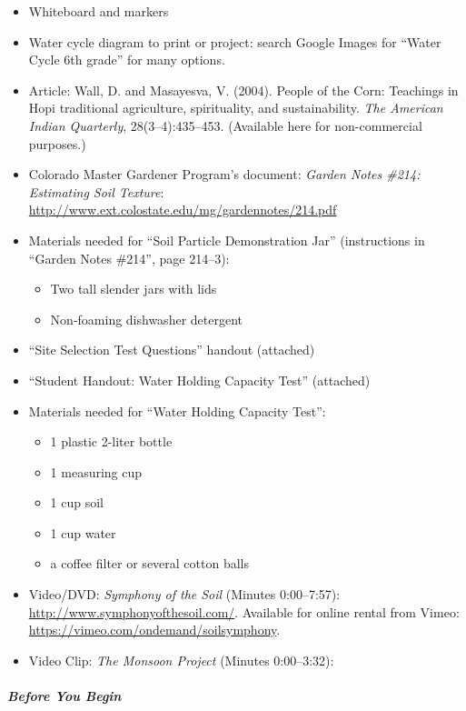 \documentclass[12pt,]{article}
\providecommand{\tightlist}{%
  \setlength{\itemsep}{0pt}\setlength{\parskip}{0pt}}
\let\oldsubparagraph\subparagraph
\renewcommand{\subparagraph}[1]{\oldsubparagraph{#1}\mbox{}}
\begin{document}
\begin{itemize}
\tightlist
\item
  Whiteboard and markers
\item
  Water cycle diagram to print or project: search Google Images for ``Water Cycle 6th grade'' for many options.
\item
  Article: Wall, D. and Masayesva, V. (2004). People of the Corn:
  Teachings in Hopi traditional agriculture, spirituality, and
  sustainability. \emph{The American Indian Quarterly}, 28(3--4):435--453.
  (Available here for non-commercial
  purposes.)
\item
  Colorado Master Gardener Program's document: \emph{Garden Notes \#214: Estimating Soil Texture}: \url{http://www.ext.colostate.edu/mg/gardennotes/214.pdf}
\item
  Materials needed for ``Soil Particle Demonstration Jar'' (instructions in ``Garden Notes \#214'', page 214--3):

  \begin{itemize}
  \tightlist
  \item
    Two tall slender jars with lids
  \item
    Non-foaming dishwasher detergent
  \end{itemize}
\item
  ``Site Selection Test Questions'' handout (attached)
\item
  ``Student Handout: Water Holding Capacity Test'' (attached)
\item
  Materials needed for ``Water Holding Capacity Test'':

  \begin{itemize}
  \tightlist
  \item
    1 plastic 2-liter bottle
  \item
    1 measuring cup
  \item
    1 cup soil
  \item
    1 cup water
  \item
    a coffee filter or several cotton balls
  \end{itemize}
\item
  Video/DVD: \emph{Symphony of the Soil} (Minutes 0:00--7:57):
  \url{http://www.symphonyofthesoil.com/}. Available for online rental from Vimeo: \url{https://vimeo.com/ondemand/soilsymphony}.
\item
  Video Clip: \emph{The Monsoon Project} (Minutes 0:00--3:32):
\end{itemize}

\hypertarget{before-you-begin}{%
\subparagraph{Before You Begin}\label{before-you-begin}}
\end{document}
